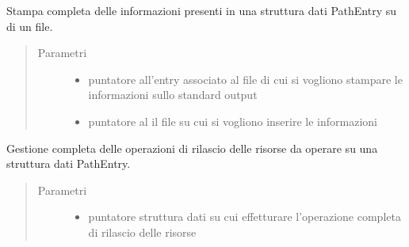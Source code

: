 \documentclass[letterpaper,10pt,italian,openany,oneside]{sphinxmanual}
\begin{document}

\begin{fulllineitems}
\label{\detokenize{code/scan:c.printOnFile}}
Stampa completa delle informazioni presenti in una struttura dati PathEntry su di un file.
\begin{quote}\begin{description}
\item[{Parametri}] \leavevmode\begin{itemize}
\item {} 
 \textendash{} puntatore all’entry associato al file di cui si vogliono stampare le informazioni sullo standard output

\item {} 
 \textendash{} puntatore al il file su cui si vogliono inserire le informazioni

\end{itemize}

\end{description}\end{quote}

\end{fulllineitems}


\begin{fulllineitems}
\label{\detokenize{code/scan:c.freePath}}
Gestione completa delle operazioni di rilascio delle risorse da operare su una struttura dati PathEntry.
\begin{quote}\begin{description}
\item[{Parametri}] \leavevmode\begin{itemize}
\item {} 
 \textendash{} puntatore struttura dati su cui effetturare l’operazione completa di rilascio delle risorse

\end{itemize}

\end{description}\end{quote}

\end{fulllineitems}
\end{document}

